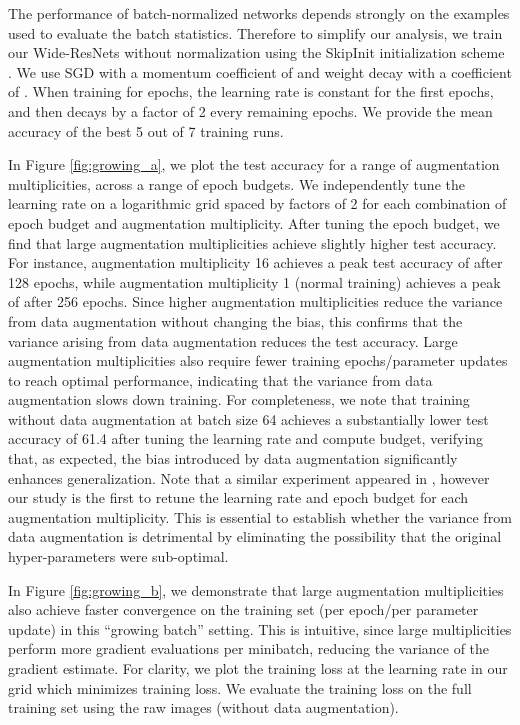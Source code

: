 \documentclass{article}
\begin{document}
The performance of batch-normalized networks depends strongly on the examples used to evaluate the batch statistics. Therefore to simplify our analysis, we train our Wide-ResNets without normalization using the SkipInit initialization scheme \citep{de2020batch}. We use SGD with a momentum coefficient of  and weight decay with a coefficient of . When training for  epochs, the learning rate is constant for the first  epochs, and then decays by a factor of 2 every remaining  epochs. We provide the mean accuracy of the best 5 out of 7 training runs. 

In Figure \ref{fig:growing_a}, we plot the test accuracy for a range of augmentation multiplicities, across a range of epoch budgets. We independently tune the learning rate on a logarithmic grid spaced by factors of 2 for each combination of epoch budget and augmentation multiplicity. After tuning the epoch budget, we find that large augmentation multiplicities achieve slightly higher test accuracy. For instance, augmentation multiplicity 16 achieves a peak test accuracy of  after 128 epochs, while augmentation multiplicity 1 (normal training) achieves a peak of  after 256 epochs. Since higher augmentation multiplicities reduce the variance from data augmentation without changing the bias, this confirms that the variance arising from data augmentation reduces the test accuracy. Large augmentation multiplicities also require fewer training epochs/parameter updates to reach optimal performance, indicating that the variance from data augmentation slows down training. For completeness, we note that training without data augmentation at batch size 64 achieves a substantially lower test accuracy of 61.4 after tuning the learning rate and compute budget, verifying that, as expected, the bias introduced by data augmentation significantly enhances generalization. 
Note that a similar experiment appeared in \citet{hoffer2019augment}, however our study is the first to retune the learning rate and epoch budget for each augmentation multiplicity. This is essential to establish whether the variance from data augmentation is detrimental by eliminating the possibility that the original hyper-parameters were sub-optimal.


In Figure \ref{fig:growing_b}, we demonstrate that large augmentation multiplicities also achieve faster convergence on the training set (per epoch/per parameter update) in this ``growing batch'' setting. This is intuitive, since large multiplicities perform more gradient evaluations per minibatch, reducing the variance of the gradient estimate. For clarity, we plot the training loss at the learning rate in our grid which minimizes training loss. We evaluate the training loss on the full training set using the raw images (without data augmentation). 
\end{document}
